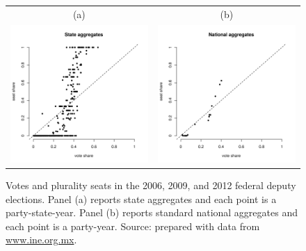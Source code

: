 \documentclass[letter,12pt]{article}
\begin{document}
\begin{figure}
\begin{center}
\begin{tabular}{cc}
    (a) & (b) \\
    \includegraphics[width=.48\columnwidth]{resXedo20062012sh.pdf} &
    \includegraphics[width=.48\columnwidth]{resNal20062012sh.pdf} 
\end{tabular}
\caption{Votes and plurality seats in the 2006, 2009, and 2012 federal deputy elections. Panel (a) reports state aggregates and each point is a party-state-year. Panel (b) reports standard national aggregates and each point is a party-year. Source: prepared with data from \url{www.ine.org.mx}.}\label{F:seatsVotes}
\end{center}
\end{figure}
\end{document}
